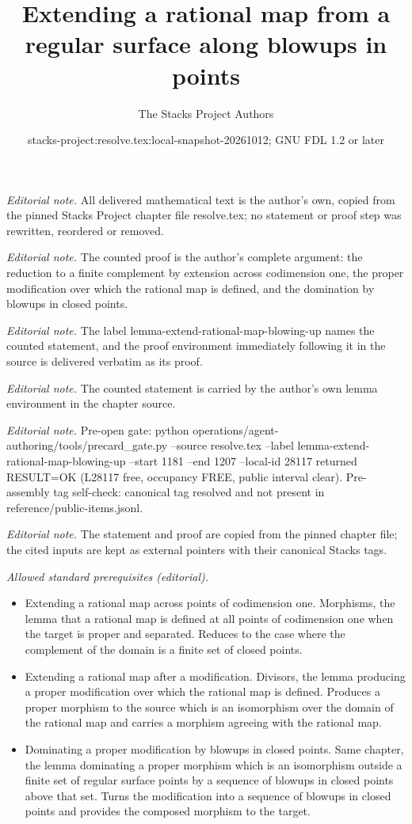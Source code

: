 \documentclass[10pt,a4paper]{amsart}
\title{Extending a rational map from a regular surface along blowups in points}
\author{The Stacks Project Authors}
\date{stacks-project:resolve.tex:local-snapshot-20261012; GNU FDL 1.2 or later}
\theoremstyle{plain}
\theoremstyle{definition}
\theoremstyle{remark}
\numberwithin{equation}{subsection}
\begin{document}
\maketitle
\noindent\textit{Editorial note.} All delivered mathematical text is the author's own, copied from the pinned Stacks Project chapter file resolve.tex; no statement or proof step was rewritten, reordered or removed.\par\medskip
\noindent\textit{Editorial note.} The counted proof is the author's complete argument: the reduction to a finite complement by extension across codimension one, the proper modification over which the rational map is defined, and the domination by blowups in closed points.\par\medskip
\noindent\textit{Editorial note.} The label lemma-extend-rational-map-blowing-up names the counted statement, and the proof environment immediately following it in the source is delivered verbatim as its proof.\par\medskip
\noindent\textit{Editorial note.} The counted statement is carried by the author's own lemma environment in the chapter source.\par\medskip
\noindent\textit{Editorial note.} Pre-open gate: python operations/agent-authoring/tools/precard\_gate.py --source resolve.tex --label lemma-extend-rational-map-blowing-up --start 1181 --end 1207 --local-id 28117 returned RESULT=OK (L28117 free, occupancy FREE, public interval clear). Pre-assembly tag self-check: canonical tag resolved and not present in reference/public-items.jsonl.\par\medskip
\noindent\textit{Editorial note.} The statement and proof are copied from the pinned chapter file; the cited inputs are kept as external pointers with their canonical Stacks tags.\par\medskip
\noindent\textit{Allowed standard prerequisites (editorial).}\begin{itemize}
\item Extending a rational map across points of codimension one. Morphisms, the lemma that a rational map is defined at all points of codimension one when the target is proper and separated. Reduces to the case where the complement of the domain is a finite set of closed points.
\item Extending a rational map after a modification. Divisors, the lemma producing a proper modification over which the rational map is defined. Produces a proper morphism to the source which is an isomorphism over the domain of the rational map and carries a morphism agreeing with the rational map.
\item Dominating a proper modification by blowups in closed points. Same chapter, the lemma dominating a proper morphism which is an isomorphism outside a finite set of regular surface points by a sequence of blowups in closed points above that set. Turns the modification into a sequence of blowups in closed points and provides the composed morphism to the target.
\end{itemize}\medskip
\end{document}
